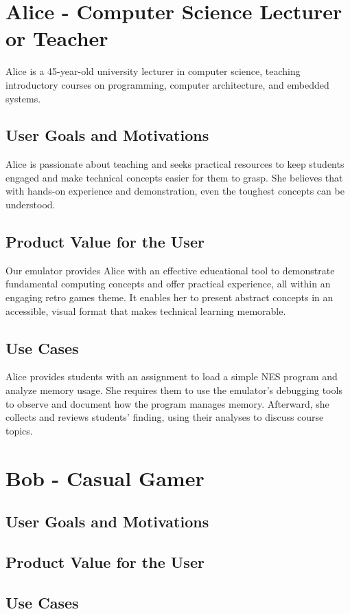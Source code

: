 \documentclass[a4paper, 11pt]{article}
\begin{document}
\section{Alice - Computer Science Lecturer or Teacher}
Alice is a 45-year-old university lecturer in computer science, teaching introductory courses on programming, computer architecture, and embedded systems.

\subsection{User Goals and Motivations}
Alice is passionate about teaching and seeks practical resources to keep students engaged and make technical concepts easier for them to grasp. She believes that with hands-on experience and demonstration, even the toughest concepts can be understood.

\subsection{Product Value for the User}
Our emulator provides Alice with an effective educational tool to demonstrate fundamental computing concepts and offer practical experience, all within an engaging retro games theme. It enables her to present abstract concepts in an accessible, visual format that makes technical learning memorable.

\subsection{Use Cases}
Alice provides students with an assignment to load a simple NES program and analyze memory usage. She requires them to use the emulator's debugging tools to observe and document how the program manages memory. Afterward, she collects and reviews students' finding, using their analyses to discuss course topics.

\section{Bob - Casual Gamer}

\subsection{User Goals and Motivations}

\subsection{Product Value for the User}

\subsection{Use Cases}
\end{document}
